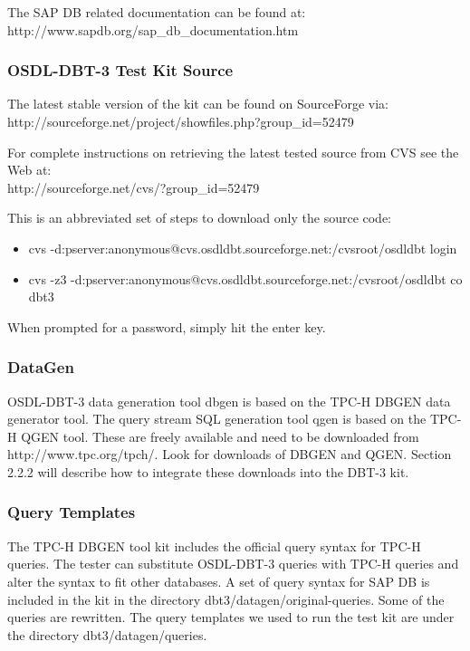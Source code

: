 \documentclass{article}
\begin{document}
\noindent
The SAP DB related documentation can be found at: \\
\indent http://www.sapdb.org/sap\_db\_documentation.htm

\subsubsection{OSDL-DBT-3 Test Kit Source}

\noindent
The latest stable version of the kit can be found on SourceForge
via: \\
\indent http://sourceforge.net/project/showfiles.php?group\_id=52479

\noindent
For complete instructions on retrieving the latest tested source from
CVS see the Web at: \\
\indent http://sourceforge.net/cvs/?group\_id=52479

\noindent
This is an abbreviated set of steps to download only the source
code: \\
\begin{itemize}
\item cvs -d:pserver:anonymous@cvs.osdldbt.sourceforge.net:/cvsroot/osdldbt
      login
\item cvs -z3
      -d:pserver:anonymous@cvs.osdldbt.sourceforge.net:/cvsroot/osdldbt
      co dbt3
\end{itemize}

\noindent
When prompted for a password, simply hit the enter key.  

\subsubsection{DataGen}

\noindent
OSDL-DBT-3 data generation tool dbgen is based on the TPC-H DBGEN
data generator tool.  The query stream SQL generation tool qgen is
based on the TPC-H QGEN tool.  These are freely available and need to
be downloaded from http://www.tpc.org/tpch/.  Look for downloads of
DBGEN and QGEN.  Section 2.2.2 will describe how to integrate these
downloads into the DBT-3 kit.

\subsubsection{Query Templates}

\noindent
The TPC-H DBGEN tool kit includes the official query syntax for TPC-H
queries.  The tester can substitute OSDL-DBT-3 queries with TPC-H
queries and alter the syntax to fit other databases.  A set of query
syntax for SAP DB is included in the kit in the directory
dbt3/datagen/original-queries.  Some of the queries are rewritten.
The query templates we used to run the test kit are under the
directory dbt3/datagen/queries.
\end{document}
